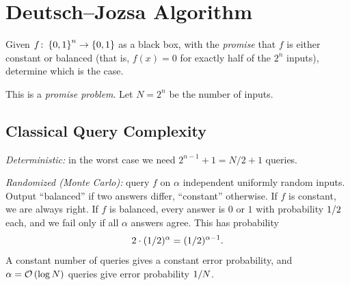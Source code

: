 \section{Deutsch--Jozsa Algorithm}

\begin{problem}
    Given $f \colon \left\lbrace0,1\right\rbrace^n \to \left\lbrace0,1\right\rbrace$ as a black box, with the \emph{promise} that $f$ is
    either constant or balanced (that is, $f(x) = 0$ for exactly half of the $2^n$ inputs), determine
    which is the case.
\end{problem}

This is a \emph{promise problem}. Let $N = 2^n$ be the number of inputs.

\subsection{Classical Query Complexity}

\emph{Deterministic:} in the worst case we need $2^{n-1} + 1 = N/2 + 1$ queries.

\emph{Randomized (Monte Carlo):} query $f$ on $\alpha$ independent uniformly random inputs. Output
``balanced'' if two answers differ, ``constant'' otherwise. If $f$ is constant, we are always right.
If $f$ is balanced, every answer is $0$ or $1$ with probability $1/2$ each, and we fail
only if all $\alpha$ answers agree. This has probability
\[2 \cdot (1/2)^{\alpha} = (1/2)^{\alpha - 1}.\]
A constant number of queries gives a constant error probability, and $\alpha = \mathcal{O}\left(\log N\right)$
queries give error probability $1/N$.

